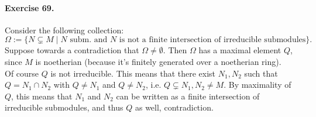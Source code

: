 \documentclass[12pt,a4paper]{report}
\theoremstyle{definition}
\theoremstyle{num.custom-title}
\begin{document}
\paragraph{Exercise 69.} Consider the following collection:
\[
\Omega := \{ N \subsetneq M \mid N \text{ subm. and } N \text{ is not a finite intersection of irreducible submodules}\}.
\]
Suppose towards a contradiction that $\Omega \neq \emptyset$. Then $\Omega$ has a maximal element $Q$, since $M$ is noetherian (because it's finitely generated over a noetherian ring).\\
Of course $Q$ is not irreducible. This means that there exist $N_1,N_2$ such that $Q=N_1 \cap N_2$ with $Q \neq N_1$ and $Q \neq N_2$, i.e. $Q \subsetneq N_1,N_2 \neq M$. By maximality of $Q$, this means that $N_1$ and $N_2$ can be written as a finite intersection of irreducible submodules, and thus $Q$ as well, contradiction.
\end{document}
